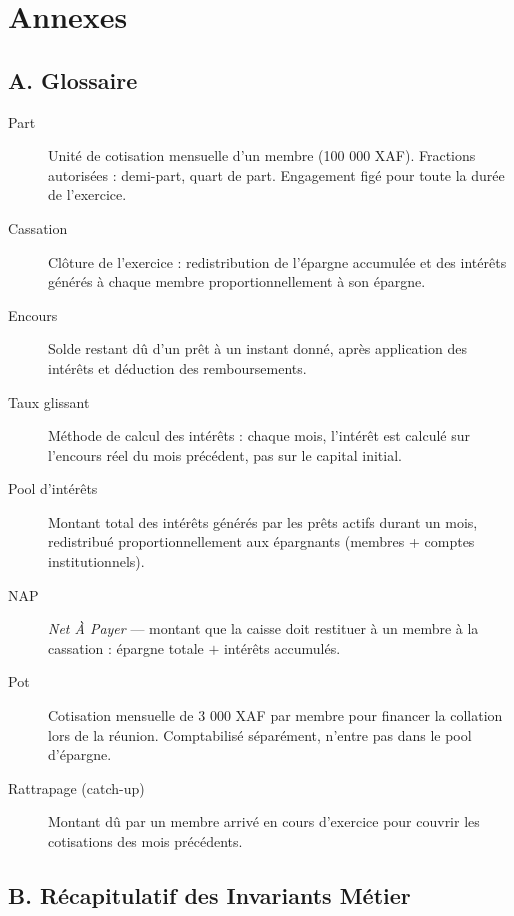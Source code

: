 \documentclass[12pt, a4paper]{report}
\begin{document}
\chapter*{Annexes}

\section*{A. Glossaire}

\begin{description}
  \item[Part] Unité de cotisation mensuelle d'un membre (100 000 XAF). Fractions autorisées : demi-part,
              quart de part. Engagement figé pour toute la durée de l'exercice.
  \item[Cassation] Clôture de l'exercice : redistribution de l'épargne accumulée et des intérêts générés
                   à chaque membre proportionnellement à son épargne.
  \item[Encours] Solde restant dû d'un prêt à un instant donné, après application des intérêts et déduction
                 des remboursements.
  \item[Taux glissant] Méthode de calcul des intérêts : chaque mois, l'intérêt est calculé sur l'encours
                       réel du mois précédent, pas sur le capital initial.
  \item[Pool d'intérêts] Montant total des intérêts générés par les prêts actifs durant un mois, redistribué
                          proportionnellement aux épargnants (membres + comptes institutionnels).
  \item[NAP] \textit{Net À Payer} — montant que la caisse doit restituer à un membre à la cassation :
             épargne totale $+$ intérêts accumulés.
  \item[Pot] Cotisation mensuelle de 3 000 XAF par membre pour financer la collation lors de la réunion.
             Comptabilisé séparément, n'entre pas dans le pool d'épargne.
  \item[Rattrapage (catch-up)] Montant dû par un membre arrivé en cours d'exercice pour couvrir les
                               cotisations des mois précédents.
\end{description}

\section*{B. Récapitulatif des Invariants Métier}
\end{document}
